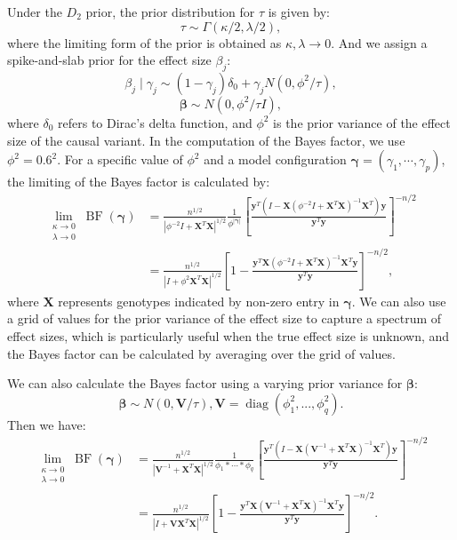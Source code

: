 \documentclass[pdflatex,sn-mathphys-num]{sn-jnl}%
\theoremstyle{thmstyleone}%
\theoremstyle{thmstyletwo}%
\theoremstyle{thmstylethree}%
\begin{document}
Under the $D_2$ prior, the prior distribution for $\tau$ is given by:
$$\tau \sim \Gamma\left(\kappa/2, \lambda/2\right),$$
where the limiting form of the prior is obtained as $\kappa,\lambda \rightarrow 0$. And we assign a spike-and-slab prior for the effect size $\beta_j$:
$$\beta_j \mid \gamma_j \sim (1-\gamma_j)\delta_0 + \gamma_j N\left(0, \phi^2/\tau\right),$$
$$\boldsymbol{\beta} \sim N(0, \phi^2/\tau I),$$
where $\delta_0$ refers to Dirac's delta function, and $\phi^2$ is the prior variance of the effect size of the causal variant. In the computation of the Bayes factor, we use $\phi^2=0.6^2$. For a specific value of $\phi^2$ and a model configuration $\boldsymbol{\gamma}=\left(\gamma_1,\cdots,\gamma_{p}\right)$, the limiting of the Bayes factor is calculated by:
\begin{align}
    \lim _{\substack{\kappa \rightarrow 0 \\ \lambda \rightarrow 0}} \operatorname{BF}(\boldsymbol{\gamma}) &= \frac{n^{1/2}}{|\phi^{-2}I + \mathbf{X}^T\mathbf{X}|^{1 / 2}}  \frac{1}{\phi^{|\boldsymbol{\gamma}|}} \left[\frac{\mathbf{y}^T\left(I-\mathbf{X}\left(\phi^{-2}I+\mathbf{X}^T \mathbf{X}\right)^{-1} \mathbf{X}^T\right) \mathbf{y}}{\mathbf{y}^T \mathbf{y}}\right]^{-n / 2} \\
    &=  \frac{n^{1/2}}{|I + \phi^2\mathbf{X}^T\mathbf{X}|^{1 / 2}}   \left[1- \frac{\mathbf{y}^T\mathbf{X}\left(\phi^{-2}I+\mathbf{X}^T \mathbf{X}\right)^{-1} \mathbf{X}^T \mathbf{y}}{\mathbf{y}^T \mathbf{y}}\right]^{-n / 2},
\end{align}
where $\mathbf{X}$ represents genotypes indicated by non-zero entry in $\boldsymbol{\gamma}$. We can also use a grid of values for the prior variance of the effect size to capture a spectrum of effect sizes, which is particularly useful when the true effect size is unknown, and the Bayes factor can be calculated by averaging over the grid of values.


We can also calculate the Bayes factor using a varying prior variance for $\boldsymbol{\beta}$: $$\boldsymbol{\beta} \sim N(0, \mathbf{V}/\tau), \mathbf{V} = \operatorname{diag}(\phi^2_1,...,\phi^2_q).$$
Then we have:
\begin{align}
    \lim _{\substack{\kappa \rightarrow 0 \\ \lambda \rightarrow 0}} \operatorname{BF}(\boldsymbol{\gamma}) &= \frac{n^{1/2}}{|\mathbf{V}^{-1} + \mathbf{X}^T\mathbf{X}|^{1 / 2}} \frac{1}{\phi_1*\cdots*\phi_q} \left[\frac{\mathbf{y}^T\left(I-\mathbf{X}\left(\mathbf{V}^{-1}+\mathbf{X}^T \mathbf{X}\right)^{-1} \mathbf{X}^T\right) \mathbf{y}}{\mathbf{y}^T \mathbf{y}}\right]^{-n / 2} \\
    &=  \frac{n^{1/2}}{|I + \mathbf{V}\mathbf{X}^T\mathbf{X}|^{1 / 2}}   \left[1- \frac{\mathbf{y}^T\mathbf{X}\left(\mathbf{V}^{-1}+\mathbf{X}^T \mathbf{X}\right)^{-1} \mathbf{X}^T \mathbf{y}}{\mathbf{y}^T \mathbf{y}}\right]^{-n / 2}.
\end{align}
\end{document}
